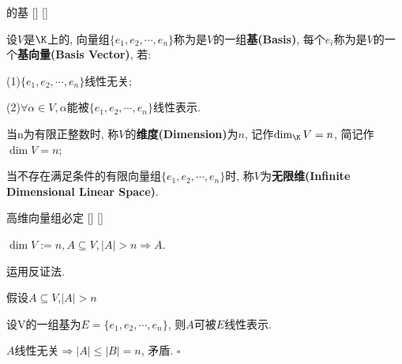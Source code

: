 \documentclass[UTF8]{ctexart}
\begin{document}
		\begin{dfn}
			[]
			{ 的基}
			[]
			[]

			设$V$是$\K$上的, 向量组$\{e_{1},e_{2},\cdots,e_{n}\}$称为是$V$的一组\textbf{基(Basis)}, 每个$e_{i}$称为是$V$的一个\textbf{基向量(Basis Vector)}, 若:
			 
			(1)$\{e_{1},e_{2},\cdots,e_{n}\}$线性无关; 
			
			(2)$\forall \alpha\in V,\alpha$能被$\{e_{1},e_{2},\cdots,e_{n}\}$线性表示. 
			
			当n为有限正整数时, 称$V$的\textbf{维度(Dimension)}为$n$, 记作$\dim_{\K}V=n$, 简记作$\dim V=n$; 
			
			当不存在满足条件的有限向量组$\{e_{1},e_{2},\cdots,e_{n}\}$时, 称$V$为\textbf{无限维(Infinite Dimensional Linear Space)}. 

		\end{dfn}
		
		\begin{ppt}
			[]
			{高维向量组必定}
			[]
			[]

			$\dim V:=n, A\subseteq V, |A|>n\Longrightarrow A$. 
		\end{ppt}
  
		\begin{prf}
			
			运用反证法. 
			
			假设$A\subseteq V$,$|A|>n$ 
			
			设V的一组基为$E=\{e_{1},e_{2},\cdots,e_{n}\}$, 则$A$可被$E$线性表示. 
			
			$A$线性无关$\Longrightarrow |A|\leq |B|=n$, 矛盾. $\square$
		\end{prf}
  
\end{document}
